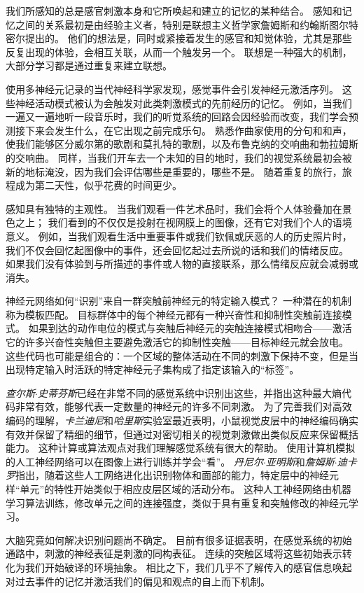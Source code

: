 我们所感知的总是感官刺激本身和它所唤起和建立的记忆的某种结合。 
感知和记忆之间的关系最初是由经验主义者，特别是联想主义哲学家詹姆斯和约翰斯图尔特密尔提出的。 
他们的想法是，同时或紧接着发生的感官和知觉体验，尤其是那些反复出现的体验，会相互关联，从而一个触发另一个。 
联想是一种强大的机制，大部分学习都是通过重复来建立联想。


使用多神经元记录的当代神经科学家发现，感觉事件会引发神经元激活序列。 
这些神经活动模式被认为会触发对此类刺激模式的先前经历的记忆。 
例如，当我们一遍又一遍地听一段音乐时，我们的听觉系统的回路会因经验而改变，我们学会预测接下来会发生什么，在它出现之前完成乐句。 
熟悉作曲家使用的分句和和声，使我们能够区分威尔第的歌剧和莫扎特的歌剧，以及布鲁克纳的交响曲和勃拉姆斯的交响曲。 
同样，当我们开车去一个未知的目的地时，我们的视觉系统最初会被新的地标淹没，因为我们会评估哪些是重要的，哪些不是。 
随着重复的旅行，旅程成为第二天性，似乎花费的时间更少。


感知具有独特的主观性。 
当我们观看一件艺术品时，我们会将个人体验叠加在景色之上； 我们看到的不仅仅是投射在视网膜上的图像，还有它对我们个人的语境意义。 
例如，当我们观看生活中重要事件或我们钦佩或厌恶的人的历史照片时，我们不仅会回忆起图像中的事件，还会回忆起过去所说的话和我们的情绪反应。 
如果我们没有体验到与所描述的事件或人物的直接联系，那么情绪反应就会减弱或消失。


神经元网络如何“识别”来自一群突触前神经元的特定输入模式？ 
一种潜在的机制称为模板匹配。 
目标群体中的每个神经元都有一种兴奋性和抑制性突触前连接模式。 
如果到达的动作电位的模式与突触后神经元的突触连接模式相吻合——激活它的许多兴奋性突触但主要避免激活它的抑制性突触——目标神经元就会放电。 
这些代码也可能是组合的：一个区域的整体活动在不同的刺激下保持不变，但是当出现特定输入时活跃的特定神经元子集构成了指定该输入的“标签”。


\textit{查尔斯$\cdot$史蒂芬斯}已经在非常不同的感觉系统中识别出这些，并指出这种最大熵代码非常有效，能够代表一定数量的神经元的许多不同刺激。
为了完善我们对高效编码的理解，\textit{卡兰迪尼}和\textit{哈里斯}实验室最近表明，小鼠视觉皮层中的神经编码确实有效并保留了精细的细节，但通过对密切相关的视觉刺激做出类似反应来保留概括能力。 
这种计算或算法观点对我们理解感觉系统有很大的帮助。 
使用计算机模拟的人工神经网络可以在图像上进行训练并学会“看”。
\textit{丹尼尔$\cdot$亚明斯}和\textit{詹姆斯$\cdot$迪卡罗}指出，随着这些人工网络进化出识别物体和面部的能力，特定层中的神经元样“单元”的特性开始类似于相应皮层区域的活动分布。
这种人工神经网络由机器学习算法训练，修改单元之间的连接强度，类似于具有重复和突触修改的神经元学习。


大脑究竟如何解决识别问题尚不确定。 
目前有很多证据表明，在感觉系统的初始通路中，刺激的神经表征是刺激的同构表征。 
连续的突触区域将这些初始表示转化为我们开始破译的环境抽象。 
相比之下，我们几乎不了解传入的感官信息唤起对过去事件的记忆并激活我们的偏见和观点的自上而下机制。


